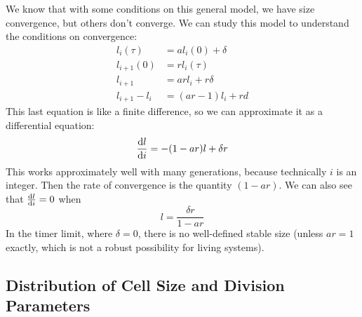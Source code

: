 \documentclass[a4paper,twoside,master.tex]{subfiles}
\begin{document}
We know that with some conditions on this general model, we have size convergence, but others don't converge. We can study this model to understand the conditions on convergence:
\begin{align}
    l_i(\tau) &= a l_i(0) + \delta \\
    l_{i+1}(0) &= r l_i(\tau) \\
    l_{i+1} &= ar l_i + r \delta \\
    l_{i+1} - l_i &= (ar - 1)l_i + rd
\end{align}
This last equation is like a finite difference, so we can approximate it as a differential equation:
\begin{equation}
    \dv{l}{i} = - (1-ar)l + \delta r
\end{equation}
This works approximately well with many generations, because technically $ i $ is an integer. Then the rate of convergence is the quantity $ (1-ar) $. We can also see that $ \dv{l}{i} = 0 $ when
\begin{equation}
    l = \frac{\delta r}{1 - ar}
\end{equation}
In the timer limit, where $ \delta = 0 $, there is no well-defined stable size (unless $ ar = 1 $ exactly, which is not a robust possibility for living systems).


\subsection{Distribution of Cell Size and Division Parameters}\label{sub:distribution_of_cell_size_and_division_parameters}
\end{document}
